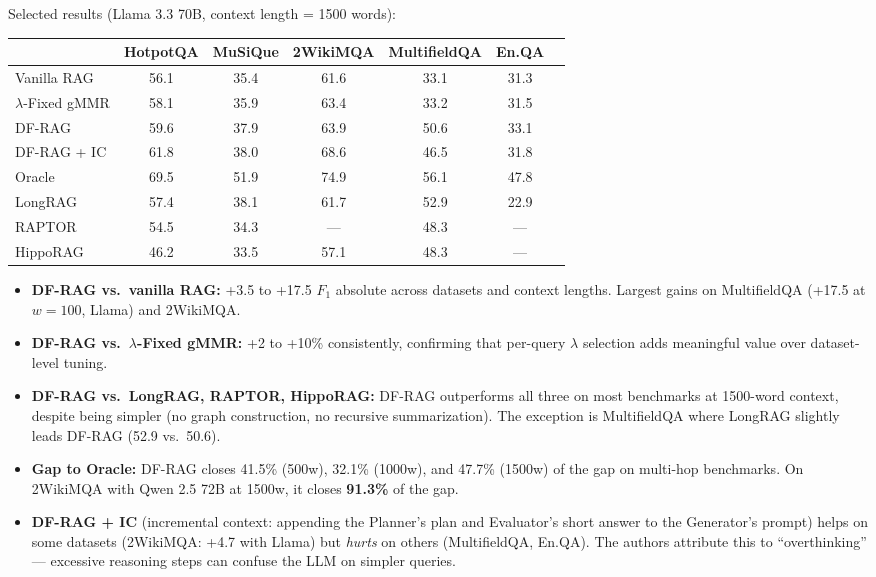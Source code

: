 \documentclass[11pt,a4paper]{article}
\begin{document}
Selected results (Llama 3.3 70B, context length = 1500 words):

\medskip
\begin{tabular}{@{}lcccccc@{}}
	\toprule
	& HotpotQA & MuSiQue & 2WikiMQA & MultifieldQA & En.QA \\
	\midrule
	Vanilla RAG & 56.1 & 35.4 & 61.6 & 33.1 & 31.3  \\
	$\lambda$-Fixed gMMR & 58.1 & 35.9 & 63.4 & 33.2 & 31.5  \\
	DF-RAG & 59.6 & 37.9 & 63.9 & 50.6 & 33.1  \\
	DF-RAG + IC & 61.8 & 38.0 & 68.6 & 46.5 & 31.8  \\
	Oracle & 69.5 & 51.9 & 74.9 & 56.1 & 47.8  \\
	\midrule
	LongRAG & 57.4 & 38.1 & 61.7 & 52.9 & 22.9  \\
	RAPTOR & 54.5 & 34.3 & --- & 48.3 & --- \\
	HippoRAG & 46.2 & 33.5 & 57.1 & 48.3 & --- \\
	\bottomrule
\end{tabular}

\medskip
\begin{itemize}[leftmargin=*]
	\item \textbf{DF-RAG vs.\ vanilla RAG:} +3.5 to +17.5 $F_1$ absolute across datasets and context lengths. Largest gains on MultifieldQA (+17.5 at $w=100$, Llama) and 2WikiMQA.
	\item \textbf{DF-RAG vs.\ $\lambda$-Fixed gMMR:} +2 to +10\% consistently, confirming that per-query $\lambda$ selection adds meaningful value over dataset-level tuning.
	\item \textbf{DF-RAG vs.\ LongRAG, RAPTOR, HippoRAG:} DF-RAG outperforms all three on most benchmarks at 1500-word context, despite being simpler (no graph construction, no recursive summarization). The exception is MultifieldQA where LongRAG slightly leads DF-RAG (52.9 vs.\ 50.6).
	\item \textbf{Gap to Oracle:} DF-RAG closes 41.5\% (500w), 32.1\% (1000w), and 47.7\% (1500w) of the gap on multi-hop benchmarks. On 2WikiMQA with Qwen 2.5 72B at 1500w, it closes \textbf{91.3\%} of the gap.
	\item \textbf{DF-RAG + IC} (incremental context: appending the Planner's plan and Evaluator's short answer to the Generator's prompt) helps on some datasets (2WikiMQA: +4.7 with Llama) but \emph{hurts} on others (MultifieldQA, En.QA). The authors attribute this to ``overthinking'' --- excessive reasoning steps can confuse the LLM on simpler queries.
\end{itemize}
\end{document}
